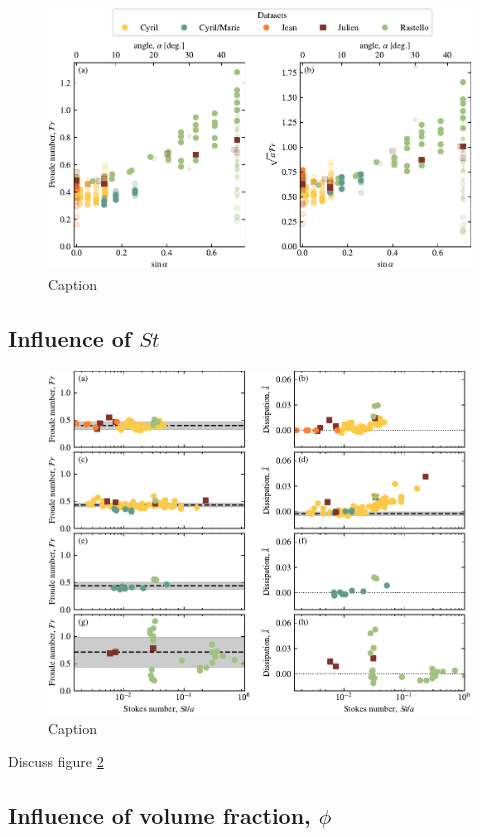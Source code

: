 \documentclass[twocolumn]{article}
\begin{document}
\begin{figure}
	\centering
	\includegraphics{figure4.pdf}
	\caption{Caption}
	\label{fig:fig4}
\end{figure}

\subsection{Influence of $St$}

\begin{figure}
	\centering
	\includegraphics{figure5.pdf}
	\caption{Caption}
	\label{fig:fig5}
\end{figure}

Discuss figure \ref{fig:fig5}

\subsection{Influence of volume fraction, $\phi$}
\end{document}
